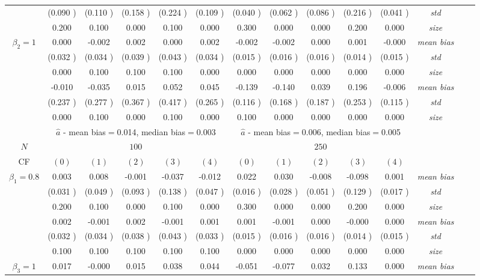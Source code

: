 \begin{table}
\begin{threeparttable}
{\begin{tabular}{|c|c|c|c|c|c|c|c|c|c|c|c|c|c|}
&(0.090 )&(0.110 )&(0.158 )&(0.224 )&(0.109 )&(0.040 )&(0.062 )&(0.086 )&(0.216 )&(0.041 )&\textit{std}\\ 
& 0.200 & 0.100 &0.000 &0.100 &0.000 &0.300& 0.000 &0.000 &0.200& 0.000 &\textit{size} \\ \midrule 
\multirow{4}{*}{$\beta_2=1$}& 0.000 & -0.002 &0.002 &0.000 &0.002 &-0.002& -0.002 &0.000 &0.001& -0.000 &\textit{mean bias} \\ 
&(0.032 )&(0.034 )&(0.039 )&(0.043 )&(0.034 )&(0.015 )&(0.016 )&(0.016 )&(0.014 )&(0.015 )&\textit{std}\\ 
& 0.000 & 0.100 &0.100 &0.100 &0.000 &0.000& 0.000 &0.000& 0.000 &0.000 &\textit{size} \\\midrule 
\multirow{4}{*}{$\beta_3=1$}& -0.010 & -0.035 &0.015& 0.052 &0.045 &-0.139 &-0.140 &0.039 &0.196& -0.006 &\textit{mean bias} \\ 
&(0.237 )&(0.277 )&(0.367 )&(0.417 )&(0.265 )&(0.116 )&(0.168 )&(0.187 )&(0.253 )&(0.115 )&\textit{std}\\ 
& 0.000 & 0.100 &0.000 &0.100 &0.000 &0.100& 0.000& 0.000 &0.000 &0.000 &\textit{size} \\\midrule 
&\multicolumn{5}{|c|}{$\hat{a}$ - mean bias$=$0.014, median bias$=$0.003 }&\multicolumn{5}{|c|}{$\hat{a}$ - mean bias$=$0.006, median bias$=$0.005 }&\\ \hline 
\cellcolor{yellow}$N$&\multicolumn{5}{|c|}{\cellcolor{yellow}$100$}&\multicolumn{5}{|c|}{\cellcolor{yellow}$250$}&\\\hline 
CF&$(0)$&$(1)$&$(2)$&$(3)$&$(4)$& $(0)$ &$(1)$&$(2)$&$(3)$&$(4)$&\\\hline 
\multirow{4}{*}{$\beta_1=0.8$}& 0.003 & 0.008 &-0.001 &-0.037 &-0.012 &0.022& 0.030 &-0.008 &-0.098& 0.001 &\textit{mean bias} \\ 
&(0.031 )&(0.049 )&(0.093 )&(0.138 )&(0.047 )&(0.016 )&(0.028 )&(0.051 )&(0.129 )&(0.017 )&\textit{std}\\ 
& 0.200 & 0.100 &0.000 &0.100 &0.000 &0.300& 0.000 &0.000 &0.200& 0.000 &\textit{size} \\\midrule 
\multirow{4}{*}{$\beta_2=1$}& 0.002 & -0.001 &0.002 &-0.001 &0.001 &0.001& -0.001 &0.000 &-0.000& 0.000 &\textit{mean bias} \\ 
&(0.032 )&(0.034 )&(0.038 )&(0.043 )&(0.033 )&(0.015 )&(0.016 )&(0.016 )&(0.014 )&(0.015 )&\textit{std}\\ 
& 0.100 & 0.100 &0.100 &0.100 &0.100 &0.000& 0.000 &0.000& 0.000 &0.000 &\textit{size} \\ \midrule
\multirow{4}{*}{$\beta_3=1$}& 0.017 & -0.000 &0.015& 0.038 &0.044 &-0.051 &-0.077 &0.032 &0.133& 0.000 &\textit{mean bias} \\ 

\end{tabular}}
\end{threeparttable}
\end{table}
